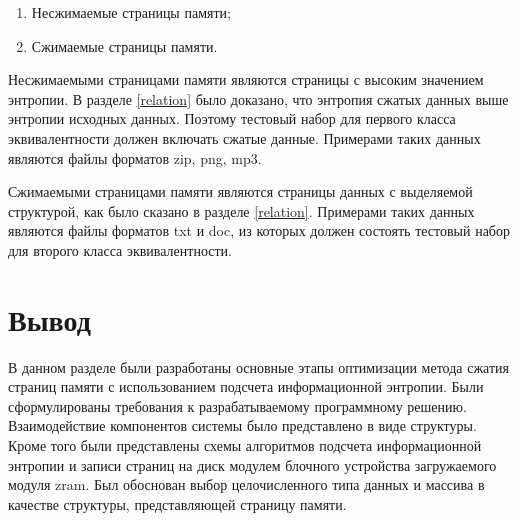 \begin{enumerate}
	\item Несжимаемые страницы памяти;
	\item Сжимаемые страницы памяти.
\end{enumerate}

Несжимаемыми страницами памяти являются страницы с высоким значением энтропии. В разделе \ref{relation} было доказано, что энтропия сжатых данных выше энтропии исходных данных. Поэтому тестовый набор для первого класса эквивалентности должен включать сжатые данные. Примерами таких данных являются файлы форматов zip, png, mp3.

Сжимаемыми страницами памяти являются страницы данных с выделяемой структурой, как было сказано в разделе \ref{relation}. Примерами таких данных являются файлы форматов txt и doc, из которых должен состоять тестовый набор для второго класса эквивалентности.

\section*{Вывод}

В данном разделе были разработаны основные этапы оптимизации метода сжатия страниц памяти с использованием подсчета информационной энтропии. Были сформулированы требования к разрабатываемому программному решению. Взаимодействие компонентов системы было представлено в виде структуры. Кроме того были представлены схемы алгоритмов подсчета информационной энтропии и записи страниц на диск модулем блочного устройства загружаемого модуля zram. Был обоснован выбор целочисленного типа данных и массива в качестве структуры, представляющей страницу памяти.
